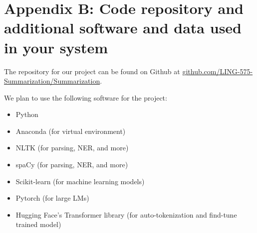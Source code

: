 \documentclass[11pt]{article}
\begin{document}
\section{Appendix B: Code repository and additional software and data used in your system}

The repository for our project can be found on Github at \href{https://github.com/LING-575-Summarization/Summarization}{github.com/LING-575-Summarization/Summarization}.

We plan to use the following software for the project: 

\begin{itemize}
    \item Python
    \item Anaconda (for virtual environment)
    \item NLTK (for parsing, NER, and more)
    \item spaCy (for parsing, NER, and more)
    \item Scikit-learn (for machine learning models)
    \item Pytorch (for large LMs)
    \item Hugging Face's Transformer library (for auto-tokenization and find-tune trained model)
\end{itemize}

\nocite{jurafsky-martin-draft, radev-etal-2000-centroid}


\end{document}
